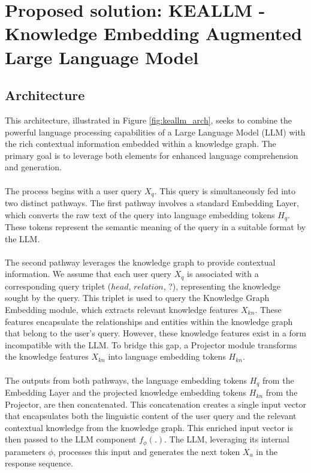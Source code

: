 \section{Proposed solution: KEALLM - Knowledge Embedding Augmented Large Language Model}
\subsection{Architecture}
This architecture, illustrated in Figure \ref{fig:keallm_arch}, seeks to combine the powerful language processing capabilities of a Large Language Model (LLM) with the rich contextual information embedded within a knowledge graph. The primary goal is to leverage both elements for enhanced language comprehension and generation.\\\\
The process begins with a user query $X_q$. This query is simultaneously fed into two distinct pathways. The first pathway involves a standard Embedding Layer, which converts the raw text of the query into language embedding tokens $H_q$. These tokens represent the semantic meaning of the query in a suitable format by the LLM.\\\\
The second pathway leverages the knowledge graph to provide contextual information. We assume that each user query $X_q$ is associated with a corresponding query triplet ($head$, $relation$, ?), representing the knowledge sought by the query. This triplet is used to query the Knowledge Graph Embedding module, which extracts relevant knowledge features $X_{kn}$. These features encapsulate the relationships and entities within the knowledge graph that belong to the user's query. However, these knowledge features exist in a form incompatible with the LLM. To bridge this gap, a Projector module transforms the knowledge features $X_{kn}$ into language embedding tokens $H_{kn}$.\\\\
The outputs from both pathways, the language embedding tokens $H_q$ from the Embedding Layer and the projected knowledge embedding tokens $H_{kn}$ from the Projector, are then concatenated. This concatenation creates a single input vector that encapsulates both the linguistic content of the user query and the relevant contextual knowledge from the knowledge graph.
This enriched input vector is then passed to the LLM component $f_{\phi}(.)$. The LLM, leveraging its internal parameters $\phi$, processes this input and generates the next token $X_a$ in the response sequence.
